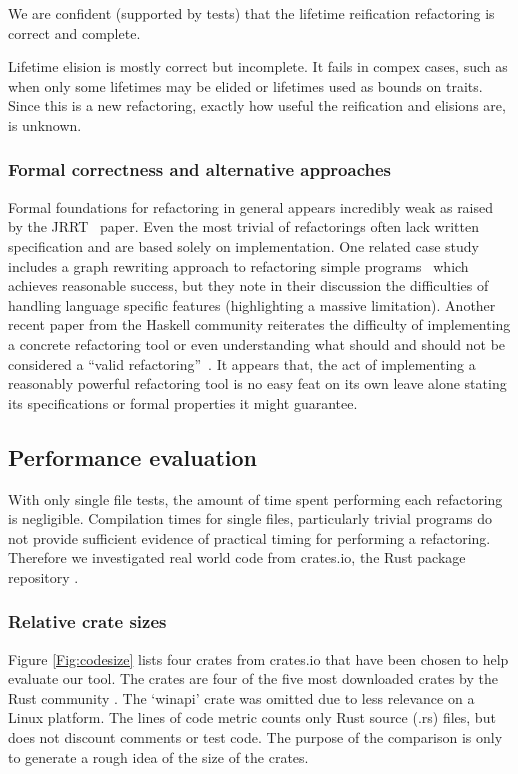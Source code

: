 We are confident (supported by tests) that the lifetime reification refactoring is correct and complete.

Lifetime elision is mostly correct but incomplete. It fails in compex cases, such as when only some lifetimes may be elided or lifetimes used as bounds on traits. Since this is a new refactoring, exactly how useful the reification and elisions are, is unknown.

\subsubsection{Formal correctness and alternative approaches}

Formal foundations for refactoring in general appears incredibly weak as raised by the JRRT~\cite{schafer2010specification} paper. Even the most trivial of refactorings often lack written specification and are based solely on implementation. One related case study includes a graph rewriting approach to refactoring simple programs~\cite{graph} which achieves reasonable success, but they note in their discussion the difficulties of handling language specific features (highlighting a massive limitation). Another recent paper from the Haskell community reiterates the difficulty of implementing a concrete refactoring tool or even understanding what should and should not be considered a ``valid refactoring''~\cite{sculthorpe}. It appears that, the act of implementing a reasonably powerful refactoring tool is no easy feat on its own leave alone stating its specifications or formal properties it might guarantee.

\subsection{Performance evaluation}\label{S:perfeval}
With only single file tests, the amount of time spent performing each refactoring is negligible. Compilation times for single files, particularly trivial programs do not provide sufficient evidence of practical timing for performing a refactoring. Therefore we investigated real world code from  crates.io, the Rust package repository \cite{cratesio15}. 

\subsubsection{Relative crate sizes}
Figure \ref{Fig:codesize} lists  four crates from crates.io that have been chosen to help evaluate our tool. The crates are four of the five most downloaded crates by the Rust community \cite{cratesio15}. The `winapi' crate was omitted due to less relevance on a Linux platform. The lines of code metric counts only Rust source (.rs) files, but does not discount comments or test code. The purpose of the comparison is only to generate a rough idea of the size of the crates.

